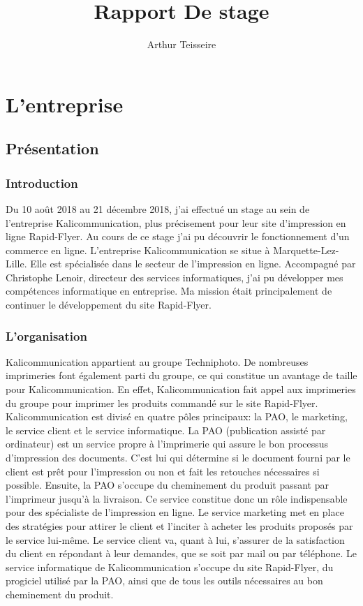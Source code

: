 \documentclass[a4paper]{report}
\title{Rapport De stage}
\author{Arthur Teisseire}
\begin{document}
\tableofcontents
\part{L'entreprise}
\chapter{Présentation}
\section{Introduction}
Du 10 août 2018 au 21 décembre 2018, j'ai effectué un stage au sein de l'entreprise Kalicommunication, plus précisement pour leur site d'impression en ligne Rapid-Flyer. Au cours de ce stage j'ai pu découvrir le fonctionnement d'un commerce en ligne.\newline
L'entreprise Kalicommunication se situe à Marquette-Lez-Lille. Elle est spécialisée dans le secteur de l'impression en ligne.\newline
Accompagné par Christophe Lenoir, directeur des services informatiques, j'ai pu développer mes compétences informatique en entreprise. Ma mission était principalement de continuer le développement du site Rapid-Flyer.
\section{L'organisation}
Kalicommunication appartient au groupe Techniphoto. De nombreuses imprimeries font également parti du groupe, ce qui constitue un avantage de taille pour Kalicommunication. En effet, Kalicommunication fait appel aux imprimeries du groupe pour imprimer les produits commandé sur le site Rapid-Flyer.\newline
Kalicommunication est divisé en quatre pôles principaux: la PAO, le marketing, le service client et le service informatique.\newline
La PAO (publication assisté par ordinateur) est un service propre à l'imprimerie qui assure le bon processus d'impression des documents. C'est lui qui détermine si le document fourni par le client est prêt pour l'impression ou non et fait les retouches nécessaires si possible. Ensuite, la PAO s'occupe du cheminement du produit passant par l'imprimeur jusqu'à la livraison. Ce service constitue donc un rôle indispensable pour des spécialiste de l'impression en ligne.\newline
Le service marketing met en place des stratégies pour attirer le client et l'inciter à acheter les produits proposés par le service lui-même.\newline
Le service client va, quant à lui, s'assurer de la satisfaction du client en répondant à leur demandes, que se soit par mail ou par téléphone.\newline
Le service informatique de Kalicommunication s'occupe du site Rapid-Flyer, du progiciel utilisé par la PAO, ainsi que de tous les outils nécessaires au bon cheminement du produit.
\end{document}
